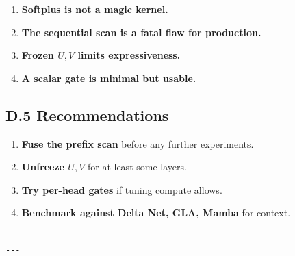 \begin{enumerate}
\item \textbf{Softplus is not a magic kernel.}
\item \textbf{The sequential scan is a fatal flaw for production.}
\item \textbf{Frozen $U, V$ limits expressiveness.}
\item \textbf{A scalar gate is minimal but usable.}

\end{enumerate}
\subsection{D.5 Recommendations}

\begin{enumerate}
\item \textbf{Fuse the prefix scan} before any further experiments.
\item \textbf{Unfreeze $U, V$} for at least some layers.
\item \textbf{Try per-head gates} if tuning compute allows.
\item \textbf{Benchmark against Delta Net, GLA, Mamba} for context.
\end{enumerate}
\begin{lstlisting}

---
\end{lstlisting}